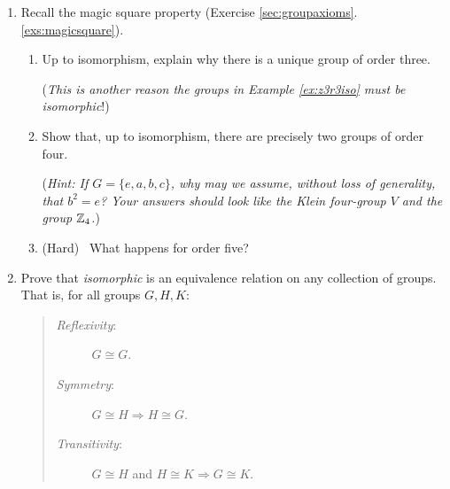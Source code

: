\begin{exercises}{}
\begin{enumerate}
\begin{enumerate}
		  \item By considering the number of solutions to the equations in part (a), obtain a contradiction and hence conclude that $(\Q,+)\ncong(\Q^+,\cdot)$.
		\end{enumerate}
		(Extra challenge) \ Suppose $\phi:(\Q,+)\to(\R,\cdot)$ is a \emph{homomorphism} and that $\phi(1)=a$: find a formula for $\phi(x)$.
			
	
		\item Recall the magic square property (Exercise \ref*{sec:groupaxioms}.\ref{exs:magicsquare}).
		\begin{enumerate}
		  \item Up to isomorphism, explain why there is a unique group of order three.\par
		  (\emph{This is another reason the groups in Example \ref{ex:z3r3iso} must be isomorphic}!)
		  
		  \item Show that, up to isomorphism, there are precisely two groups of order four.\par
			(\emph{Hint: If $G=\{e,a,b,c\}$, why may we assume, without loss of generality, that $b^2=e$? Your answers should look like the Klein four-group $V$ and the group $\mathbb{Z}_4$.})
			\item (Hard) \ What happens for order five?
		\end{enumerate}
			
			
		\item\label{exs:isomorphiccomposition} Prove that \emph{isomorphic} is an equivalence relation on any collection of groups. That is, for all groups $G,H,K$:
		\begin{quote}
			\begin{description}
			  \item[\emph{Reflexivity}:] $G\cong G$.
			  \item[\emph{Symmetry}:] $G\cong H\Longrightarrow H\cong G$.
			  \item[\emph{Transitivity}:] $G\cong H$ and $H\cong K\Longrightarrow G\cong K$.
			\end{description}
		\end{quote}
		
	\end{enumerate}
\end{exercises}